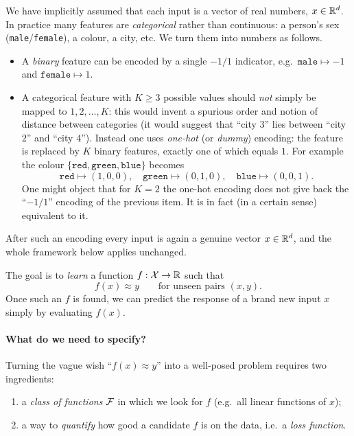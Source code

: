 \begin{remark}
We have implicitly assumed that each input is a vector of real numbers,
$x \in \mathbb{R}^d$. In practice many features are \emph{categorical} rather than
continuous: a person's sex (\texttt{male}/\texttt{female}), a colour, a city,
etc. We turn them into numbers as follows.
\begin{itemize}
    \item A \emph{binary} feature can be encoded by a single $-1/1$ indicator, e.g.\
    $\texttt{male} \mapsto -1$ and $\texttt{female} \mapsto 1$.
    \item A categorical feature with $K \geq 3$ possible values should
    \emph{not} simply be mapped to $1, 2, \dots, K$: this would invent a
    spurious order and notion of distance between categories (it would suggest
    that ``city $3$'' lies between ``city $2$'' and ``city $4$''). Instead one
    uses \emph{one-hot} (or \emph{dummy}) encoding: the feature is replaced by
    $K$ binary features, exactly one of which equals $1$. For example the colour
    $\{\texttt{red}, \texttt{green}, \texttt{blue}\}$ becomes
    \[
    \texttt{red} \mapsto (1,0,0), \quad
    \texttt{green} \mapsto (0,1,0), \quad
    \texttt{blue} \mapsto (0,0,1) .
    \]
    One might object that for $K = 2$ the one-hot encoding does not give back the ``$-1/1$''
    encoding of the previous item. It is in fact (in a certain sense) equivalent to it.
\end{itemize}
After such an encoding every input is again a genuine vector $x \in \mathbb{R}^d$, and
the whole framework below applies unchanged.
\end{remark}

The goal is to \emph{learn} a function $f : \mathcal{X} \to \mathbb{R}$ such that
\[
f(x) \approx y \qquad \text{for unseen pairs } (x, y).
\]
Once such an $f$ is found, we can predict the response of a brand new input
$x$ simply by evaluating $f(x)$.

\paragraph{What do we need to specify?}
Turning the vague wish ``$f(x) \approx y$'' into a well-posed problem requires
two ingredients:
\begin{enumerate}
    \item a \emph{class of functions} $\mathcal{F}$ in which we look for $f$ (e.g.\ all
    linear functions of $x$);
    \item a way to \emph{quantify} how good a candidate $f$ is on the data,
    i.e.\ a \emph{loss function}.
\end{enumerate}

